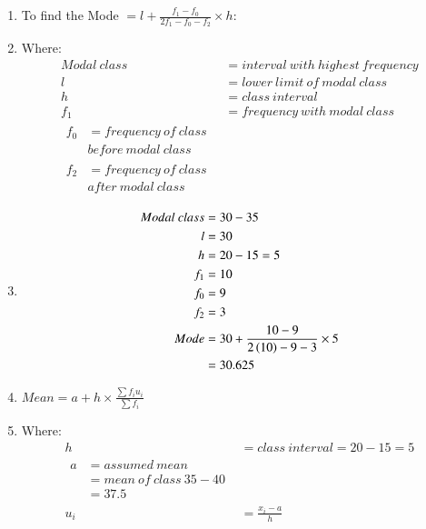 \renewcommand{\theequation}{\theenumi}
\begin{enumerate}

\item To find the Mode $= l + \frac{f_1 - f_0}{2f_1 - f_0 - f_2} \times h$:

\item Where:
\begin{align*}
Modal\ class &= interval\ with\ highest\ frequency\\
l &= lower\ limit\ of\ modal\ class\\
h &= class\ interval\\
f_1 &= frequency\ with\ modal\ class\\
\begin{split}
f_0 &= frequency\ of\ class\ \\ &before\ modal\ class
\end{split}\\
\begin{split}
f_2 &= frequency\ of\ class\ \\ &after\ modal\ class
\end{split}
\end{align*}

\item 
\begin{align}
Modal\ class &= 30 - 35\\ 
l &= 30\\
h &= 20 - 15 = 5\\
f_1 &= 10\\
f_0 &= 9\\
f_2 &= 3\\
Mode &= 30 + \frac{10-9}{2\left(10\right) - 9 - 3} \times 5\\
&= 30.625
\end{align}

\item $Mean = a + h \times \frac{\sum f_i u_i}{\sum f_i}$

\item Where:
\begin{align*}
h &= class\ interval = 20 - 15 = 5 \\
\begin{split}
a &= assumed\ mean\\
&= mean\ of\ class\ 35-40\\
&= 37.5 
\end{split}\\
u_i &= \frac{x_i-a}{h}
\end{align*}


\end{enumerate}
